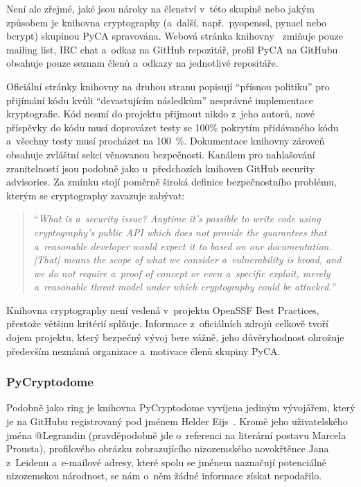 Není ale zřejmé, jaké jsou nároky na členství v~této skupině nebo jakým způsobem je knihovna cryptography (a~další, např.\ pyopenssl, pynacl nebo bcrypt) skupinou PyCA spravována. Webová stránka knihovny~\cite{pyca-web} zmiňuje pouze mailing list, IRC chat a~odkaz na GitHub repozitář, profil PyCA na GitHubu obsahuje pouze seznam členů a~odkazy na jednotlivé repositáře.

Oficiální stránky knihovny na druhou stranu popisují ``přísnou politiku'' pro přijímání kódu kvůli ``devastujícím následkům'' nesprávné implementace kryptografie. Kód nesmí do projektu přijmout nikdo z~jeho autorů, nové příspěvky do kódu musí doprovázet testy se 100\% pokrytím přidávaného kódu a~všechny testy musí procházet na 100~\%. Dokumentace knihovny zároveň obsahuje zvláštní sekci věnovanou bezpečnosti. Kanálem pro nahlašování zranitelností jsou podobně jako u~předchozích knihoven GitHub security advisories. Za zmínku stojí poměrně široká definice bezpečnostního problému, kterým se cryptography zavazuje zabývat:

\blockquote{``\textit{What is a~security issue? Anytime it’s possible to write code using cryptography’s public API which does not provide the guarantees that a~reasonable developer would expect it to based on our documentation. [That] means the scope of what we consider a~vulnerability is broad, and we do not require a~proof of concept or even a~specific exploit, merely a~reasonable threat model under which cryptography could be attacked.}''~\cite{pyca-security}}

Knihovna cryptography není vedená v~projektu OpenSSF Best Practices, přestože většinu kritérií splňuje. Informace z~oficiálních zdrojů celkově tvoří dojem projektu, který bezpečný vývoj bere vážně, jeho důvěryhodnost ohrožuje především neznámá organizace a~motivace členů skupiny PyCA.

\subsubsection*{PyCryptodome}

Podobně jako ring je knihovna PyCryptodome vyvíjena jediným vývojářem, který je na Git\-Hubu registrovaný pod jménem Helder Eijs~\cite{pcd-gh}. Kromě jeho uživatelského jména @Legrandin (pravděpodobně jde o~referenci na literární postavu Marcela Prousta), profilového obrázku zobrazujícího nizozemského novokřtěnce Jana z~Leidenu a~e-mailové adresy, které spolu se jménem naznačují potenciálně nizozemskou národnost, se nám o~něm žádné informace získat nepodařilo.


